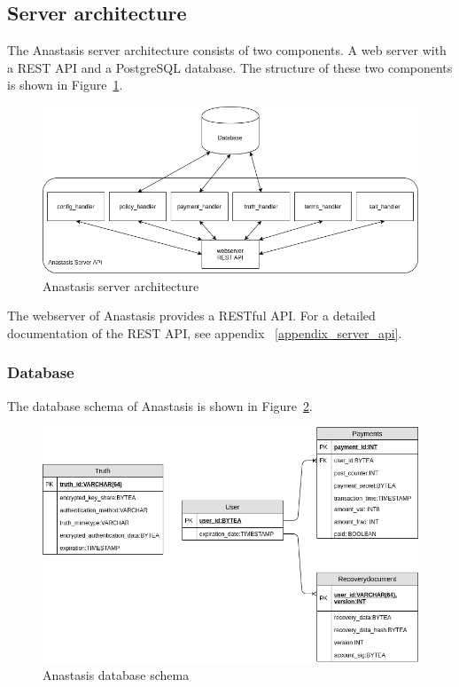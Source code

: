 \subsection{Server architecture} \label{sec:serverarch}

The Anastasis server architecture consists of two components. A web
server with a REST API and a PostgreSQL database. The structure of
these two components is shown in Figure~\ref{fig:anastasis:server}.

\begin{figure}[H]
	\centering
	\includegraphics[scale=0.45]{images/server_api.png}
	\caption{Anastasis server architecture}
	\label{fig:anastasis:server}
\end{figure}

The webserver of Anastasis provides a RESTful API. For a detailed
documentation of the REST API, see
appendix ~\ref{appendix_server_api}.

\newpage
\subsubsection{Database}

The database schema of Anastasis is shown in
Figure~\ref{fig:anastasis_database}.
\begin{figure}[H]
	\centering
	\includegraphics[scale=0.5]{images/anastasis-db.png}
	\caption{Anastasis database schema}
	\label{fig:anastasis_database}
\end{figure}

